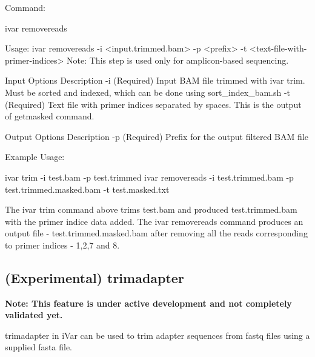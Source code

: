 Command\+:


\begin{DoxyCode}
ivar removereads

Usage: ivar removereads -i <input.trimmed.bam> -p <prefix> -t <text-file-with-primer-indices>
Note: This step is used only for amplicon-based sequencing.

Input Options    Description
           -i    (Required) Input BAM file  trimmed with ivar trim. Must be sorted and indexed, which can
       be done using sort\_index\_bam.sh
           -t    (Required) Text file with primer indices separated by spaces. This is the output of
       getmasked command.

Output Options   Description
           -p    (Required) Prefix for the output filtered BAM file
\end{DoxyCode}


Example Usage\+:


\begin{DoxyCode}
ivar trim -i test.bam -p test.trimmed
ivar removereads -i test.trimmed.bam -p test.trimmed.masked.bam -t test.masked.txt
\end{DoxyCode}


The {\ttfamily ivar trim} command above trims test.\+bam and produced test.\+trimmed.\+bam with the primer indice data added. The {\ttfamily ivar removereads} command produces an output file -\/ test.\+trimmed.\+masked.\+bam after removing all the reads corresponding to primer indices -\/ 1,2,7 and 8.\hypertarget{manualpage_autotoc_md22}{}\subsection{(\+Experimental) trimadapter}\label{manualpage_autotoc_md22}
{\bfseries Note\+: This feature is under active development and not completely validated yet.}

trimadapter in i\+Var can be used to trim adapter sequences from fastq files using a supplied fasta file. 